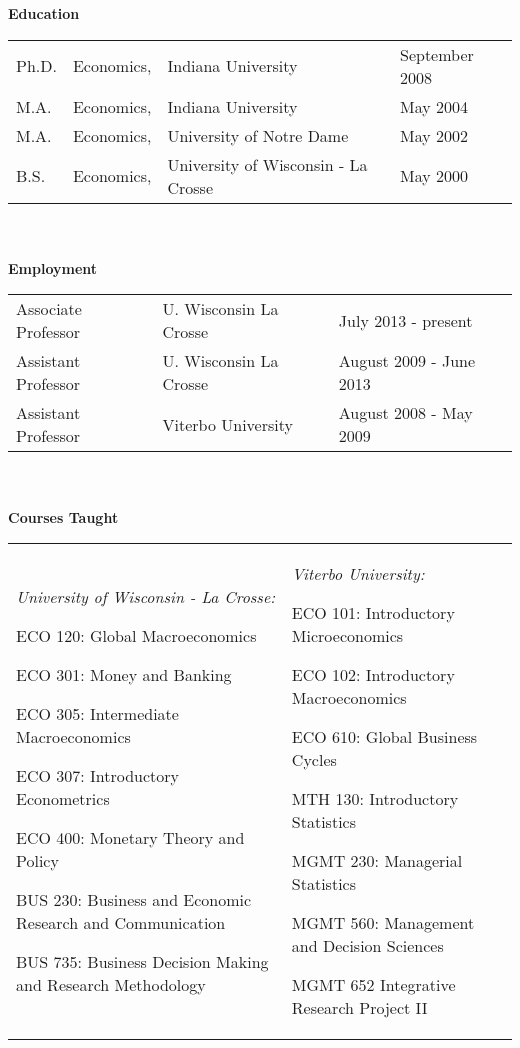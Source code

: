 \documentclass[11pt]{article}
\newcommand{\bd}{\begin{description}}
\newcommand{\ed}{\end{description}}
\newcommand{\toprule}{\par\vspace*{2pt}\noindent{\hrule\hfill}\par\vspace*{1pt}}
\begin{document}
\textbf{Education} \toprule
\hspace*{-0.5pc}\begin{tabular}{p{.5in} p{.6in} p{2.5in} p{2in}}
Ph.D. & Economics, & Indiana University & September 2008 \\
M.A. & Economics, & Indiana University & May 2004  \\
M.A. & Economics, & University of Notre Dame & May 2002 \\
B.S. & Economics, & University of Wisconsin - La Crosse & May 2000 \\
\end{tabular} \\ \\

\textbf{Employment} \toprule
\hspace*{-0.5pc}\begin{tabular}{p{1.5in} p{1.7in} p{1.5in}}
Associate Professor & U. Wisconsin La Crosse & July 2013 - present \\
Assistant Professor & U. Wisconsin La Crosse & August 2009 - June 2013 \\
Assistant Professor & Viterbo University & August 2008 - May 2009 \\
\end{tabular} \\ \\

\textbf{Courses Taught} \toprule
\begin{tabular}{p{3.25in}p{3in}}
\textit{University of Wisconsin - La Crosse:}
\bd   \setlength\itemsep{0pc}
\item ECO 120: Global Macroeconomics
\item ECO 301: Money and Banking
\item ECO 305: Intermediate Macroeconomics
\item ECO 307: Introductory Econometrics
\item ECO 400: Monetary Theory and Policy
\item BUS 230: Business and Economic Research and Communication
\item BUS 735: Business Decision Making and Research Methodology
\ed
&
\textit{Viterbo University:}
\bd \setlength\itemsep{0pc}
\item ECO 101: Introductory Microeconomics
\item ECO 102: Introductory Macroeconomics
\item ECO 610: Global Business Cycles
\item MTH 130: Introductory Statistics
\item MGMT 230: Managerial Statistics
\item MGMT 560: Management and Decision Sciences
\item MGMT 652 Integrative Research Project II
\ed
\end{tabular}
\end{document}
